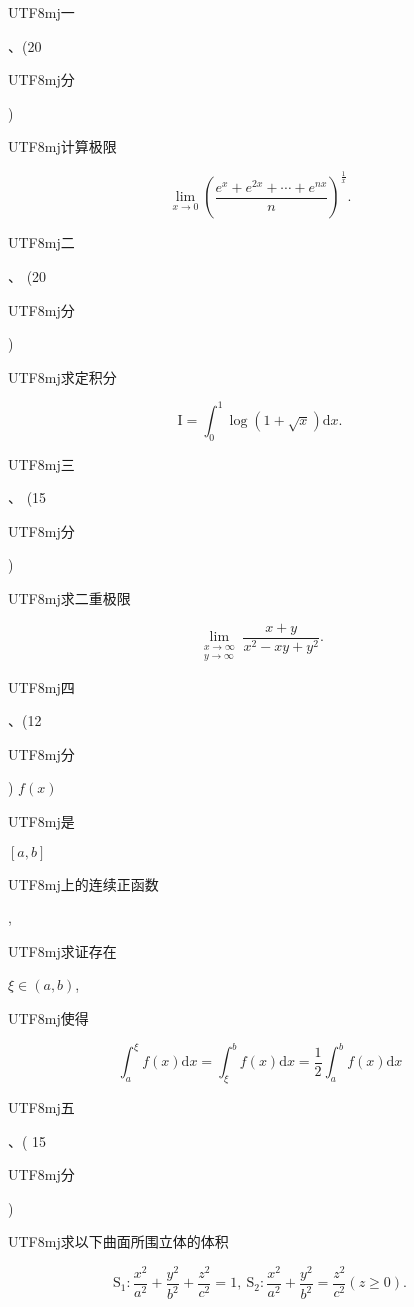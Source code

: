 \documentclass[10pt]{article}
\begin{document}
\begin{CJK}{UTF8}{mj}一\end{CJK}、(20 \begin{CJK}{UTF8}{mj}分\end{CJK}) \begin{CJK}{UTF8}{mj}计算极限\end{CJK}
$$
\lim _{x \rightarrow 0}\left(\frac{e^{x}+e^{2 x}+\cdots+e^{n x}}{n}\right)^{\frac{1}{x}} .
$$
\begin{CJK}{UTF8}{mj}二\end{CJK}、 (20 \begin{CJK}{UTF8}{mj}分\end{CJK}) \begin{CJK}{UTF8}{mj}求定积分\end{CJK}
$$
\mathrm{I}=\int_{0}^{1} \log (1+\sqrt{x}) \mathrm{d} x .
$$
\begin{CJK}{UTF8}{mj}三\end{CJK}、 (15 \begin{CJK}{UTF8}{mj}分\end{CJK}) \begin{CJK}{UTF8}{mj}求二重极限\end{CJK}
$$
\lim _{\substack{x \rightarrow \infty \\ y \rightarrow \infty}} \frac{x+y}{x^{2}-x y+y^{2}} .
$$
\begin{CJK}{UTF8}{mj}四\end{CJK}、(12 \begin{CJK}{UTF8}{mj}分\end{CJK}) $f(x)$ \begin{CJK}{UTF8}{mj}是\end{CJK} $[a, b]$ \begin{CJK}{UTF8}{mj}上的连续正函数\end{CJK}, \begin{CJK}{UTF8}{mj}求证存在\end{CJK} $\xi \in(a, b)$, \begin{CJK}{UTF8}{mj}使得\end{CJK}
$$
\int_{a}^{\xi} f(x) \mathrm{d} x=\int_{\xi}^{b} f(x) \mathrm{d} x=\frac{1}{2} \int_{a}^{b} f(x) \mathrm{d} x
$$
\begin{CJK}{UTF8}{mj}五\end{CJK}、( 15 \begin{CJK}{UTF8}{mj}分\end{CJK}) \begin{CJK}{UTF8}{mj}求以下曲面所围立体的体积\end{CJK}
$$
\mathrm{S}_{1}: \frac{x^{2}}{a^{2}}+\frac{y^{2}}{b^{2}}+\frac{z^{2}}{c^{2}}=1, \mathrm{~S}_{2}: \frac{x^{2}}{a^{2}}+\frac{y^{2}}{b^{2}}=\frac{z^{2}}{c^{2}}(z \geq 0) .
$$
\end{document}
